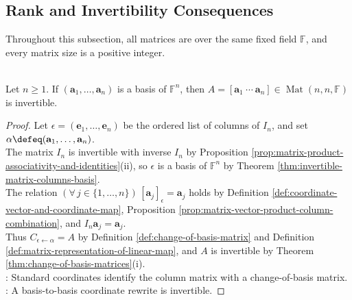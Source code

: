 \subsection{Rank and Invertibility Consequences}
Throughout this subsection, all matrices are over the same fixed field $\mathbb{F}$, and every matrix size is a positive integer.

\begin{corollary} \label{cor:basis-columns-form-invertible-matrix} \\
Let $n\geq1$. If $(\mathbf{a}_1,\ldots,\mathbf{a}_n)$ is a basis of $\mathbb{F}^n$, then $A=[\mathbf{a}_1\ \cdots\ \mathbf{a}_n]\in\operatorname{Mat}(n,n,\mathbb{F})$ is invertible.
\begin{proof}
Let $\epsilon=(\mathbf{e}_1,\ldots,\mathbf{e}_n)$ be the ordered list of columns of $I_n$, and set $\alpha\defeq(\mathbf{a}_1,\ldots,\mathbf{a}_n)$.\\
The matrix $I_n$ is invertible with inverse $I_n$ by Proposition \ref{prop:matrix-product-associativity-and-identities}(ii), so $\epsilon$ is a basis of $\mathbb{F}^n$ by Theorem \ref{thm:invertible-matrix-columns-basis}.\\
The relation $(\forall\,j\in\{1,\ldots,n\})\,[\mathbf{a}_j]_{\epsilon}=\mathbf{a}_j$ holds by Definition \ref{def:coordinate-vector-and-coordinate-map}, Proposition \ref{prop:matrix-vector-product-column-combination}, and $I_n\mathbf{a}_j=\mathbf{a}_j$.\\
Thus $C_{\epsilon\leftarrow\alpha}=A$ by Definition \ref{def:change-of-basis-matrix} and Definition \ref{def:matrix-representation-of-linear-map}, and $A$ is invertible by Theorem \ref{thm:change-of-basis-matrices}(i).\\
: Standard coordinates identify the column matrix with a change-of-basis matrix.\\
: A basis-to-basis coordinate rewrite is invertible.
\end{proof}
\end{corollary}

